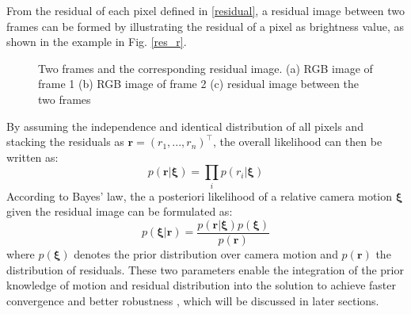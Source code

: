 \documentclass[acmsmall, nonacm, 11pt]{acmart}
\begin{document}
From the residual of each pixel defined in \eqref{residual}, a residual image between two frames can be formed by illustrating the residual of a pixel as brightness value, as shown in the example in Fig.  \ref{res_r}.

\begin{figure}[h]
    \centering
    \caption{Two frames and the corresponding residual image. (a) RGB image of frame 1 (b) RGB image of frame 2 (c) residual image between the two frames}
    \label{img_residual}
\end{figure}

By assuming the independence and identical distribution of all pixels and stacking the residuals as $\mathbf{r} = (r_1, ..., r_n )^{\top}$, the overall likelihood can then be written as:
\begin{equation*}
p(\mathbf{r} | \boldsymbol{\xi})=\prod_{i} p\left(r_{i} | \boldsymbol{\xi}\right)
\end{equation*}
According to Bayes' law, the a posteriori likelihood of a relative camera motion $\boldsymbol{\xi}$ given the residual image can be formulated as:
\begin{equation}
p(\boldsymbol{\xi} | \mathbf{r})=\frac{p(\mathbf{r} | \boldsymbol{\xi}) p(\boldsymbol{\xi})}{p(\mathbf{r})}
\label{bayes}
\end{equation}
\noindent where $p(\boldsymbol{\xi})$ denotes the prior distribution over camera motion and $p(\mathbf{r})$ the distribution of residuals. These two parameters enable the integration of the prior knowledge of motion and residual distribution into the solution to achieve faster convergence and better robustness \cite{kerl2012odometry}, which will be discussed in later sections.
\end{document}
